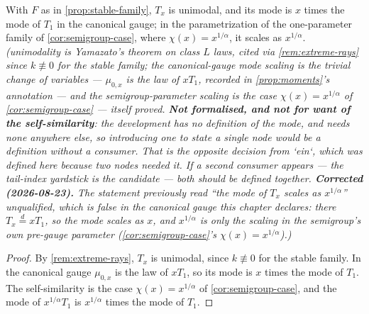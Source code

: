 \begin{proposition}\label{prop:stable-mode}
With $F$ as in \ref{prop:stable-family}, $T_x$ is unimodal, and its mode is $x$ times the mode of
$T_1$ in the canonical gauge; in the parametrization of the one-parameter family of
\ref{cor:semigroup-case}, where $\chi(x) = x^{1/\alpha}$, it scales as $x^{1/\alpha}$.
\statusT\quad\emph{(unimodality is Yamazato's theorem on class $L$ laws, cited via
\ref{rem:extreme-rays} since $k \not\equiv 0$ for the stable family; the canonical-gauge mode
scaling is the trivial change of variables --- $\mu_{0,x}$ is the law of $xT_1$, recorded in
\ref{prop:moments}'s annotation --- and the semigroup-parameter scaling is the case
$\chi(x) = x^{1/\alpha}$ of \ref{cor:semigroup-case} --- itself proved.
\textbf{Not formalised, and not for want of the self-similarity}: the development has no
definition of the mode, and needs none anywhere else, so introducing one to state a single node
would be a definition without a consumer. That is the opposite decision from `ein`, which was
defined here because two nodes needed it. If a second consumer appears --- the tail-index
yardstick is the candidate --- both should be defined together.
\textbf{Corrected (2026-08-23).} The statement previously read ``the mode of $T_x$ scales as
$x^{1/\alpha}$'' unqualified, which is false in the canonical gauge this chapter declares: there
$T_x \stackrel{d}{=} xT_1$, so the mode scales as $x$, and $x^{1/\alpha}$ is only the scaling in
the semigroup's own pre-gauge parameter (\ref{cor:semigroup-case}'s $\chi(x) = x^{1/\alpha}$).)}
\end{proposition}

\begin{proof}
By \ref{rem:extreme-rays}, $T_x$ is unimodal, since $k \not\equiv 0$ for the stable family. In the
canonical gauge $\mu_{0,x}$ is the law of $xT_1$, so its mode is $x$ times the mode of $T_1$. The
self-similarity is the case $\chi(x) = x^{1/\alpha}$ of \ref{cor:semigroup-case}, and the mode of
$x^{1/\alpha}T_1$ is $x^{1/\alpha}$ times the mode of $T_1$.
\end{proof}
